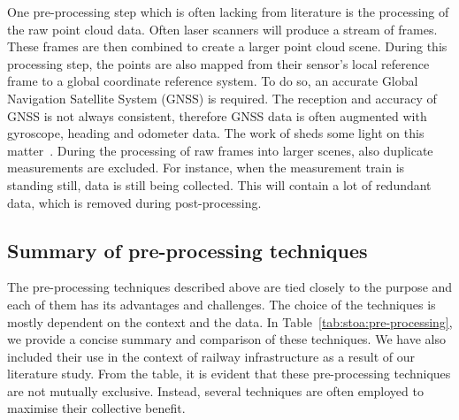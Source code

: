 One pre-processing step which is often lacking from literature is the processing of the raw point cloud data. Often laser scanners will produce a stream of frames. These frames are then combined to create a larger point cloud scene. During this processing step, the points are also mapped from their sensor's local reference frame to a global coordinate reference system. To do so, an accurate Global Navigation Satellite System (GNSS) is required. The reception and accuracy of GNSS is not always consistent, therefore GNSS data is often augmented with gyroscope, heading and odometer data. The work of \citeauthor{xu2021vehicle-born} sheds some light on this matter~\cite{xu2021vehicle-born}. During the processing of raw frames into larger scenes, also duplicate measurements are excluded. For instance, when the measurement train is standing still, data is still being collected. This will contain a lot of redundant data, which is removed during post-processing.

\subsection{Summary of pre-processing techniques}
The pre-processing techniques described above are tied closely to the purpose and each of them has its advantages and challenges. The choice of the techniques is mostly dependent on the context and the data. In Table~\ref{tab:stoa:pre-processing}, we provide a concise summary and comparison of these techniques. We have also included their use in the context of railway infrastructure as a result of our literature study. From the table, it is evident that these pre-processing techniques are not mutually exclusive. Instead, several techniques are often employed to maximise their collective benefit. 

